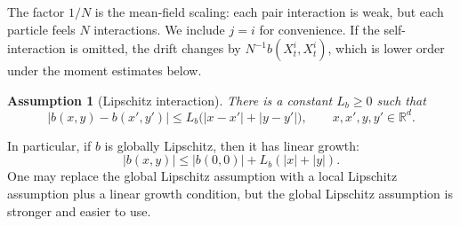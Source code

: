 \documentclass[11pt]{amsart}
\numberwithin{equation}{section}
\theoremstyle{plain}
\newtheorem{assumption}[theorem]{Assumption}
\newcommand{\R}{\mathbb{R}}
\newcommand{\abs}[1]{\left\lvert#1\right\rvert}
\begin{document}
The factor $1/N$ is the mean-field scaling: each pair interaction is weak, but
each particle feels $N$ interactions.  We include $j=i$ for convenience.  If
the self-interaction is omitted, the drift changes by
$N^{-1}b(X_t^i,X_t^i)$, which is lower order under the moment estimates below.

\begin{assumption}[Lipschitz interaction]\label{ass:regular-mf}
There is a constant $L_b\geq0$ such that
\[
  \abs{b(x,y)-b(x',y')}
  \leq L_b\bigl(\abs{x-x'}+\abs{y-y'}\bigr),
  \qquad x,x',y,y'\in\R^d.
\]
\end{assumption}
In particular, if $b$ is globally Lipschitz, then it has linear growth:
\begin{equation}\label{eq:b-linear-growth}
  \abs{b(x,y)}\leq \abs{b(0,0)}+L_b(\abs{x}+\abs{y}).
\end{equation}
One may replace the global Lipschitz assumption with a local Lipschitz assumption plus a linear growth condition, but the global Lipschitz assumption is stronger and easier to use.
\end{document}

